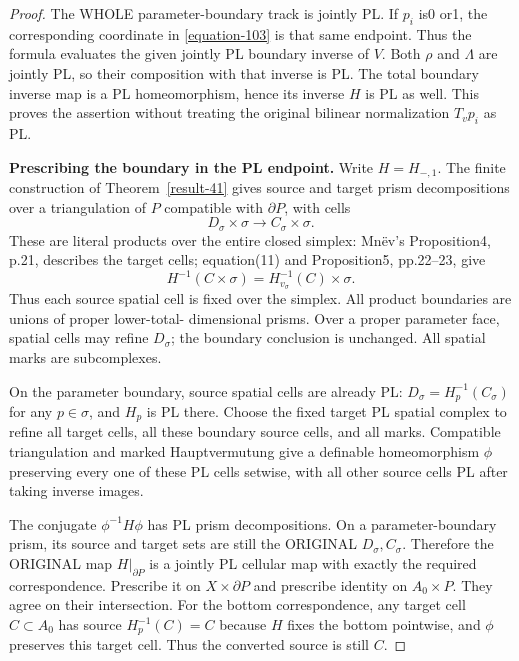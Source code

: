 \documentclass[11pt,a4paper]{article}
\theoremstyle{definition}
\begin{document}
\begin{proof}
The WHOLE parameter-boundary track is jointly PL.
If $p_i$ is0 or1, the corresponding coordinate in \eqref{equation-103}
is that same endpoint. Thus the formula evaluates the
given jointly PL boundary inverse of $V$. Both $\rho$
and $\Lambda$ are jointly PL, so their composition with
that inverse is PL. The total boundary inverse map is a
PL homeomorphism, hence its inverse $H$ is PL as well.
This proves the assertion without treating the original
bilinear normalization $T_vp_i$ as PL.

\textbf{Prescribing the boundary in the PL endpoint.}\quad
Write $H=H_{-,1}$. The finite construction of Theorem~\ref{result-41} gives
source and target prism decompositions over a triangulation
of $P$ compatible with $\partial P$, with cells
\begin{equation}
 D_\sigma\times\sigma\longrightarrow C_\sigma\times\sigma.
 \label{equation-104}
\end{equation}
These are literal products over the entire closed simplex:
Mn\"ev's Proposition4, p.21, describes the target cells;
equation(11) and Proposition5, pp.22--23, give
\[
 H^{-1}(C\times\sigma)=H_{v_\sigma}^{-1}(C)\times\sigma.
\]
Thus each source spatial cell is fixed over the simplex.
All product boundaries are unions of proper lower-total-
dimensional prisms. Over a proper parameter face, spatial
cells may refine $D_\sigma$; the boundary conclusion is
unchanged. All spatial marks are subcomplexes.

On the parameter boundary, source spatial cells are
already PL: $D_\sigma=H_p^{-1}(C_\sigma)$ for any
$p\in\sigma$, and $H_p$ is PL there. Choose the fixed
target PL spatial complex to refine all target cells,
all these boundary source cells, and all marks.
Compatible triangulation and marked Hauptvermutung give
a definable homeomorphism $\phi$ preserving every one of
these PL cells setwise, with all other source cells PL
after taking inverse images.

The conjugate $\phi^{-1}H\phi$ has PL prism decompositions.
On a parameter-boundary prism, its source and target sets
are still the ORIGINAL $D_\sigma,C_\sigma$. Therefore
the ORIGINAL map $H|_{\partial P}$ is a jointly PL
cellular map with exactly the required correspondence.
Prescribe it on $X\times\partial P$ and prescribe identity
on $A_0\times P$. They agree on their intersection.
For the bottom correspondence, any target cell
$C\subset A_0$ has source $H_p^{-1}(C)=C$ because $H$
fixes the bottom pointwise, and $\phi$ preserves this
target cell. Thus the converted source is still $C$.


\end{proof}
\end{document}
